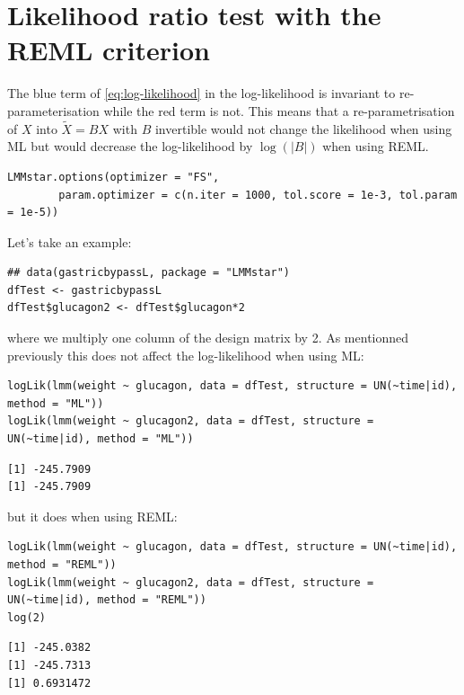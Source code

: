 \documentclass[12pt]{article}
\begin{document}
\clearpage

\section{Likelihood ratio test with the REML criterion}
\label{SM:LRT-REML}
The blue term of \autoref{eq:log-likelihood} in the log-likelihood is
invariant to re-parameterisation while the red term is not. This means
that a re-parametrisation of \(X\) into \(\tilde{X} = B X\) with \(B\)
invertible would not change the likelihood when using ML but would
decrease the log-likelihood by \(\log(|B|)\) when using REML. 
\lstset{language=r,label= ,caption= ,captionpos=b,numbers=none}
\begin{lstlisting}
LMMstar.options(optimizer = "FS",
		param.optimizer = c(n.iter = 1000, tol.score = 1e-3, tol.param = 1e-5))
\end{lstlisting}

\bigskip

Let's take an example:
\lstset{language=r,label= ,caption= ,captionpos=b,numbers=none}
\begin{lstlisting}
## data(gastricbypassL, package = "LMMstar")
dfTest <- gastricbypassL
dfTest$glucagon2 <- dfTest$glucagon*2
\end{lstlisting}

where we multiply one column of the design matrix by 2. As mentionned
previously this does not affect the log-likelihood when using ML:
\lstset{language=r,label= ,caption= ,captionpos=b,numbers=none}
\begin{lstlisting}
logLik(lmm(weight ~ glucagon, data = dfTest, structure = UN(~time|id), method = "ML"))
logLik(lmm(weight ~ glucagon2, data = dfTest, structure = UN(~time|id), method = "ML"))
\end{lstlisting}

\begin{verbatim}
[1] -245.7909
[1] -245.7909
\end{verbatim}


but it does when using REML:
\lstset{language=r,label= ,caption= ,captionpos=b,numbers=none}
\begin{lstlisting}
logLik(lmm(weight ~ glucagon, data = dfTest, structure = UN(~time|id), method = "REML"))
logLik(lmm(weight ~ glucagon2, data = dfTest, structure = UN(~time|id), method = "REML"))
log(2)
\end{lstlisting}

\begin{verbatim}
[1] -245.0382
[1] -245.7313
[1] 0.6931472
\end{verbatim}
\end{document}
